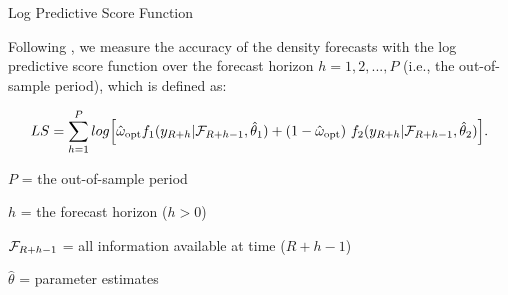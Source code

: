 \begin{frame}{Log Predictive Score Function}

\small{Following \cite{GA11}, we measure the accuracy of the density forecasts with the log predictive score function over the forecast horizon $h=1,2,...,P$ (i.e., the out-of-sample period), which is defined as:}

\vspace{-2mm}

\begin{equation}
    LS = \sum^P_{h=1} log \Big[ \hat{\omega}_{\text{opt}} f_1(y_{\small{R+h}}| \mathcal{F}_{\small{R+h-1}}, \hat\theta_1) + (1- \hat{\omega}_{\text{opt}}) \ f_2(y_{\small{R+h}}| \mathcal{F}_{\small{R+h-1}}, \hat\theta_2)\Big].
\end{equation}


\vspace{2mm}

\begin{itemize}
\small{
    \item $P$ = the out-of-sample period
    \item $h$ = the forecast horizon ($h>0$)
    \item $\mathcal{F}_{\small{R+h-1}}$ = all information available at time ($R+h-1$)
    \item $\hat\theta$ = parameter estimates
    }
\end{itemize}

\end{frame}



